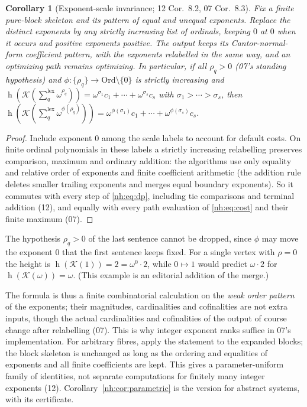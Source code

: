 \documentclass[11pt,a4paper]{article}
\newtheorem{corollary}[theorem]{Corollary}
\theoremstyle{definition}
\theoremstyle{remark}
\newcommand{\K}{\mathcal K}
\newcommand{\hgt}{\operatorname{h}}
\newcommand{\lxsi}{\mathop{\textstyle\sum}\nolimits^{\mathrm{lex}}}
\begin{document}
\begin{corollary}[Exponent-scale invariance; 12 Cor.~8.2, 07 Cor.~8.3]
\label{nh:cor:scale}
Fix a finite pure-block skeleton and its pattern of equal and unequal
exponents. Replace the distinct exponents by any strictly increasing list of
ordinals, keeping $0$ at $0$ when it occurs and positive exponents positive.
The output keeps its Cantor-normal-form coefficient pattern, with the exponents
relabelled in the same way, and an optimizing path remains optimizing. In
particular, if all $\rho_q>0$ (07's standing hypothesis) and
$\phi:\{\rho_q\}\to\mathrm{Ord}\setminus\{0\}$ is strictly
increasing and $\hgt(\K(\lxsi_q\omega^{\rho_q}))=\omega^{\sigma_1}c_1+\cdots+
\omega^{\sigma_s}c_s$ with $\sigma_1>\cdots>\sigma_s$, then
$\hgt(\K(\lxsi_q\omega^{\phi(\rho_q)}))=\omega^{\phi(\sigma_1)}c_1+\cdots+
\omega^{\phi(\sigma_s)}c_s$.
\end{corollary}
\begin{proof}
Include exponent $0$ among the scale labels to account for default costs. On
finite ordinal polynomials in these labels a strictly increasing relabelling
preserves comparison, maximum and ordinary addition: the algorithms use only
equality and relative order of exponents and finite coefficient arithmetic
(the addition rule deletes smaller trailing exponents and merges equal boundary
exponents). So it commutes with every step of \eqref{nh:eq:dp}, including tie
comparisons and terminal addition (12), and equally with every path evaluation
of \eqref{nh:eq:cost} and their finite maximum (07).
\end{proof}

The hypothesis $\rho_q>0$ of the last sentence cannot be dropped, since $\phi$
may move the exponent $0$ that the first sentence keeps fixed. For a single
vertex with $\rho=0$ the height is $\hgt(\K(1))=2=\omega^0\cdot2$, while
$0\mapsto1$ would predict $\omega\cdot2$ for $\hgt(\K(\omega))=\omega$. (This
example is an editorial addition of the merge.)

The formula is thus a finite combinatorial calculation on the \emph{weak order
pattern} of the exponents; their magnitudes, cardinalities and cofinalities are
not extra inputs, though the actual cardinalities and cofinalities of the
output of course change after relabelling (07). This is why integer exponent
ranks suffice in 07's implementation. For arbitrary fibres, apply the statement
to the expanded blocks; the block skeleton is unchanged as long as the ordering
and equalities of exponents and all finite coefficients are kept. This gives a
parameter-uniform family of identities, not separate computations for finitely
many integer exponents (12). Corollary~\ref{nh:cor:parametric} is the version
for abstract systems, with its certificate.
\end{document}
